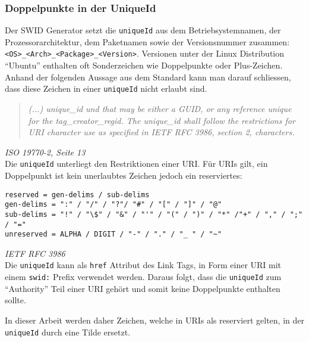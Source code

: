 \subsubsection{Doppelpunkte in der UniqueId} 
Der SWID Generator setzt die \texttt{uniqueId} aus dem Betriebsystemnamen, der
Prozessorarchitektur, dem Paketnamen sowie der Versionsnummer zusammen:
\texttt{<OS>\_<Arch>\_<Package>\_<Version>}. Versionen unter der Linux
Distribution \enquote{Ubuntu} enthalten oft Sonderzeichen wie Doppelpunkte oder
Plus-Zeichen. Anhand der folgenden Aussage aus dem Standard kann man darauf
schliessen, dass diese Zeichen in einer \texttt{uniqueId} nicht erlaubt sind.

\begin{quote}
\textit{(...) unique\_id und that may be either a GUID, or any reference unique
for the tag\_creator\_regid. The unique\_id shall follow the restrictions for
URI character use as specified in IETF RFC 3986, section 2, characters.}
\end{quote} 
\textit{ISO 19770-2\cite{iso19770-2}, Seite 13}\\

Die \texttt{uniqueId} unterliegt den Restriktionen einer URI. Für URIs gilt, ein
Doppelpunkt ist kein unerlaubtes Zeichen jedoch ein reserviertes:

\begin{verbatim} 
reserved = gen-delims / sub-delims 
gen-delims = ":" / "/" / "?"/ "#" / "[" / "]" / "@" 
sub-delims = "!" / "\$" / "&" / "'" / "(" / ")" / "*" /"+" / "," / ";" / "=" 
unreserved = ALPHA / DIGIT / "-" / "." / "_ " / "~"
\end{verbatim}
\textit{IETF RFC 3986\cite{berners2005rfc}}\\

Die \texttt{uniqueId} kann als \texttt{href} Attribut des Link Tags, in Form
einer URI mit einem \texttt{swid:} Prefix verwendet werden. Daraus folgt, dass
die \texttt{uniqueId} zum \enquote{Authority} Teil einer URI gehört und somit
keine Doppelpunkte enthalten sollte.

In dieser Arbeit werden daher Zeichen, welche in URIs als reserviert gelten, in
der \texttt{uniqueId} durch eine Tilde ersetzt.
